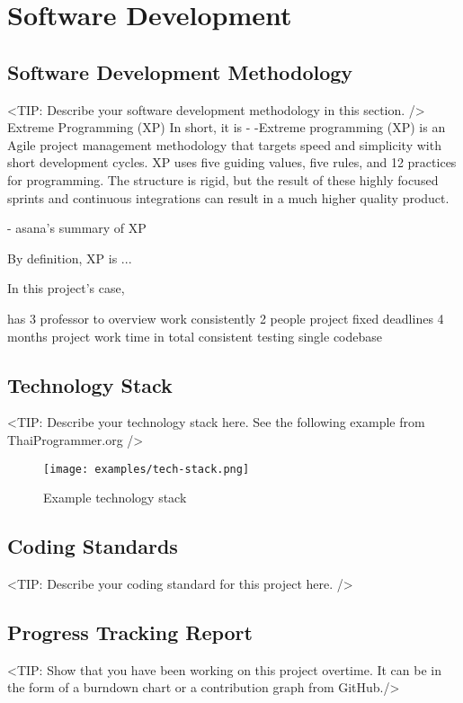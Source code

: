 \chapter{Software Development}
\label{chap:software-development}

\section{Software Development Methodology}
\label{section:software-development-methodology}
<TIP: Describe your software development methodology in this section. />
Extreme Programming (XP)
In short, it is -
-Extreme programming (XP) is an Agile project management methodology that targets speed and simplicity with short development cycles. XP uses five guiding values, five rules, and 12 practices for programming. The structure is rigid, but the result of these highly focused sprints and continuous integrations can result in a much higher quality product.

- asana's summary of XP 

By definition, XP is ...

In this project's case,


has 3 professor to overview work consistently
2 people project
fixed deadlines
4 months project work time in total
consistent testing
single codebase


\section{Technology Stack}
\label{section:technology-stack}
<TIP: Describe your technology stack here. See the following example from ThaiProgrammer.org />
\begin{figure}[h]
    \centering
    \texttt{[image: examples/tech-stack.png]}
    \caption{Example technology stack}
\end{figure}

\section{Coding Standards}
\label{section:coding-standards}
<TIP: Describe your coding standard for this project here. />

\section{Progress Tracking Report}
\label{section:progress-tracking-report}
<TIP: Show that you have been working on this project overtime.
It can be in the form of a burndown chart or a contribution graph from GitHub./>